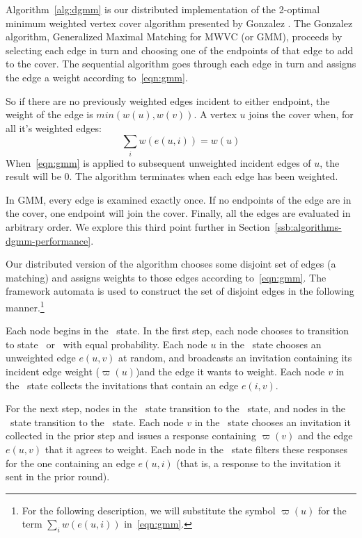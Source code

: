 \label{sec:dgmm-description}

Algorithm~\ref{alg:dgmm} is our distributed implementation of the 2-optimal minimum weighted vertex cover algorithm presented by Gonzalez \cite{Gonzalez1995129}. The Gonzalez algorithm, Generalized Maximal Matching for MWVC (or GMM), proceeds by selecting each edge in turn and choosing one of the endpoints of that edge to add to the cover. The sequential algorithm goes through each edge in turn and assigns the edge a weight according to~\eqref{eqn:gmm}.



So if there are no previously weighted edges incident to either endpoint, the weight of the edge is $min(w(u),w(v))$. A vertex $u$ joins the cover when, for all it's weighted edges: \begin{equation}\sum_i w(e(u,i)) = w(u) \label{eqn:sat} \end{equation} When~\eqref{eqn:gmm} is applied to subsequent unweighted incident edges of $u$, the result will be 0. The algorithm terminates when each edge has been weighted. 

In GMM, every edge is examined exactly once. If no endpoints of the edge are in the cover, one endpoint will join the cover. Finally, all the edges are evaluated in arbitrary order. We explore this third point further in Section~\ref{ssb:algorithms-dgmm-performance}. 

Our distributed version of the algorithm chooses some disjoint set of edges (a matching) and assigns weights to those edges according to~\eqref{eqn:gmm}. The framework automata is used to construct the set of disjoint edges in the following manner.\footnote{For the following description, we will substitute the symbol $\varpi(u)$ for the term $\sum_i w(e(u,i))$ in~\eqref{eqn:gmm}.\label{fn:varpi}}

Each node begins in the \cCd\ state. In the first step, each node chooses to transition to state \cId\ or \cLd\ with equal probability. Each node $u$ in the \cId\ state chooses an unweighted edge $e(u,v)$ at random, and broadcasts an invitation containing its incident edge weight ($\varpi(u)$)\footnotemark[\value{footnote}] and the edge it wants to weight. Each node $v$ in the \cLd\ state collects the invitations that contain an edge $e(i,v)$.

For the next step, nodes in the \cLd\ state transition to the \cRd\ state, and nodes in the \cId\ state transition to the \cWd\ state. Each node $v$ in the \cLd\ state chooses an invitation it collected in the prior step and issues a response containing $\varpi(v)$ and the edge $e(u,v)$ that it agrees to weight. Each node in the \cWd\ state filters these responses for the one containing an edge $e(u,i)$ (that is, a response to the invitation it sent in the prior round). 

